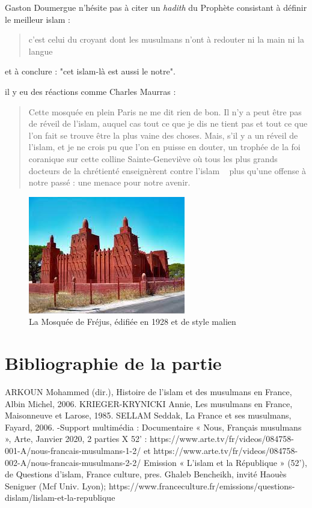 Gaston Doumergue n'hésite pas à citer un \emph{hadith} du Prophète consistant à définir le meilleur islam : 
\begin{quote}
    c'est celui du croyant dont les musulmans n'ont à redouter ni la main ni la langue
\end{quote}
et à conclure : "cet islam-là est aussi le notre".


il y eu des réactions comme Charles Maurras : 
\begin{quote}
    Cette mosquée en plein Paris ne me dit rien de
bon. Il n'y a peut être pas de réveil de l'islam, auquel cas tout ce
que je dis ne tient pas et tout ce que l'on fait se trouve être la plus vaine des choses. Mais, s'il y a un réveil de l'islam, et je ne
crois pu que l'on en puisse en douter, un trophée de la foi coranique sur cette colline Sainte-Geneviève où tous les plus grands docteurs
de la chrétienté enseignèrent contre l'islam ~ plus
qu'une offense à notre passé : une menace pour notre avenir. 
\end{quote}

\begin{figure}
    \centering
    \includegraphics[width=\textwidth]{Images/MosqueeFrejus.jpg}
    \caption{La Mosquée de Fréjus, édifiée en 1928 et de style malien}
    \label{fig:Frejus}
\end{figure}
\section{Bibliographie de la partie}
ARKOUN Mohammed (dir.), Histoire de l’islam et des musulmans en France, Albin
Michel, 2006.
KRIEGER-KRYNICKI Annie, Les musulmans en France, Maisonneuve et Larose,
1985.
SELLAM Seddak, La France et ses musulmans, Fayard, 2006.
-Support multimédia :
Documentaire « Nous, Français musulmans », Arte, Janvier 2020, 2 parties X 52’ :
https://www.arte.tv/fr/videos/084758-001-A/nous-francais-musulmans-1-2/ et
https://www.arte.tv/fr/videos/084758-002-A/nous-francais-musulmans-2-2/
Emission « L’islam et la République » (52’), de Questions d’islam, France culture,
pres. Ghaleb Bencheikh, invité Haouès Seniguer (Mcf Univ. Lyon);
https://www.franceculture.fr/emissions/questions-dislam/lislam-et-la-republique